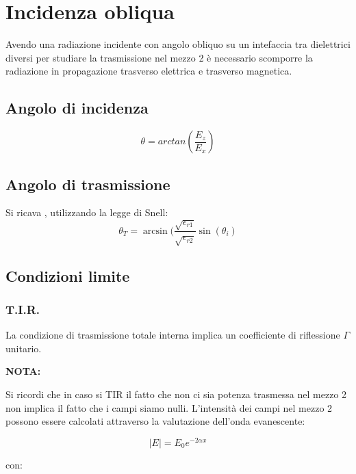 \chapter{Incidenza obliqua}

	Avendo una radiazione incidente con angolo obliquo su un intefaccia tra dielettrici diversi per studiare la trasmissione nel mezzo 2 è necessario scomporre la radiazione in propagazione trasverso elettrica e trasverso magnetica.

	\section{Angolo di incidenza}

		\begin{equation}
		\theta=arctan(\frac{E_z}{E_x})
		\end{equation}



	\section{Angolo di trasmissione}
	Si ricava , utilizzando la legge di Snell:
	\begin{equation}
	\theta_T=\arcsin(\frac{\sqrt{\epsilon_{r1}}}{\sqrt{\epsilon_{r2}}}\sin(\theta_i)
	\label{eq:leggedisnell}
	\end{equation} 
	
	\section{Condizioni limite}

		\subsection{T.I.R.}
			La condizione di trasmissione totale interna implica un coefficiente di riflessione $\Gamma$ unitario.

			\textbf{NOTA:}

			Si ricordi che in caso si TIR il fatto che non ci sia potenza trasmessa nel mezzo 2 non implica il fatto che i campi siamo nulli.
			L'intensità dei campi nel mezzo 2 possono essere calcolati attraverso la valutazione dell'onda evanescente:


		\begin{equation}
		|E|=E_0 e^{-2 \alpha x}
		\end{equation}

		con:

